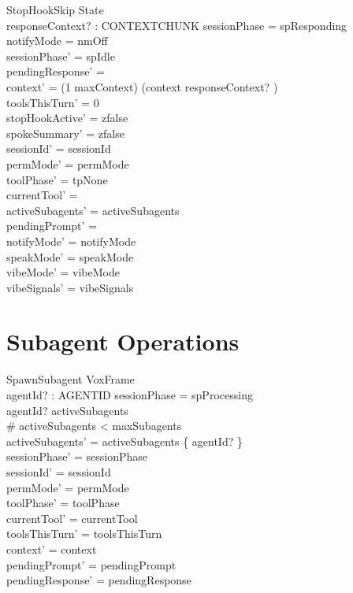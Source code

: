 \documentclass[a4paper,10pt,fleqn]{article}
\begin{document}
\begin{schema}{StopHookSkip}
  \Delta State \\
  responseContext? : CONTEXTCHUNK
  \where
  sessionPhase = spResponding \\
  notifyMode = nmOff \\
  sessionPhase' = spIdle \\
  pendingResponse' = \emptyset \\
  context' = (1 \upto maxContext) \dres (context \cat \langle responseContext? \rangle) \\
  toolsThisTurn' = 0 \\
  stopHookActive' = zfalse \\
  spokeSummary' = zfalse \\
  sessionId' = sessionId \\
  permMode' = permMode \\
  toolPhase' = tpNone \\
  currentTool' = \emptyset \\
  activeSubagents' = activeSubagents \\
  pendingPrompt' = \emptyset \\
  notifyMode' = notifyMode \\
  speakMode' = speakMode \\
  vibeMode' = vibeMode \\
  vibeSignals' = vibeSignals
\end{schema}

\section{Subagent Operations}

\begin{schema}{SpawnSubagent}
  VoxFrame \\
  agentId? : AGENTID
  \where
  sessionPhase = spProcessing \\
  agentId? \notin activeSubagents \\
  \# activeSubagents < maxSubagents \\
  activeSubagents' = activeSubagents \cup \{ agentId? \} \\
  sessionPhase' = sessionPhase \\
  sessionId' = sessionId \\
  permMode' = permMode \\
  toolPhase' = toolPhase \\
  currentTool' = currentTool \\
  toolsThisTurn' = toolsThisTurn \\
  context' = context \\
  pendingPrompt' = pendingPrompt \\
  pendingResponse' = pendingResponse
\end{schema}
\end{document}
